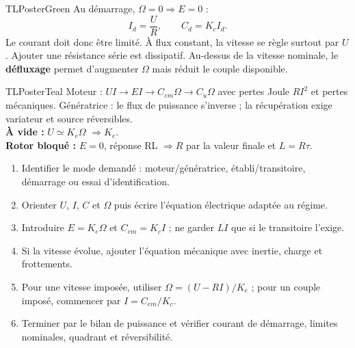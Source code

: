 \documentclass[10pt,a3paper]{article}
\begin{document}
\begin{minipage}[t]{0.49\linewidth}
\begin{TLPosterBloc}{TLPosterGreen}
Au démarrage, $\Omega=0\Rightarrow E=0$ :
\[
I_d=\frac{U}{R},\qquad C_d=K_cI_d.
\]
Le courant doit donc être limité. À flux constant, la vitesse se règle surtout par $U$. Ajouter une résistance série est dissipatif. Au-dessus de la vitesse nominale, le \textbf{défluxage} permet d'augmenter $\Omega$ mais réduit le couple disponible.
\end{TLPosterBloc}
\begin{TLPosterBloc}{TLPosterTeal}
Moteur : $UI\rightarrow EI\rightarrow C_{em}\Omega\rightarrow C_u\Omega$ avec pertes Joule $RI^2$ et pertes mécaniques. Génératrice : le flux de puissance s'inverse ; la récupération exige variateur et source réversibles.\\[1mm]
\textbf{À vide :} $U\simeq K_e\Omega$ $\Rightarrow K_e$.\\
\textbf{Rotor bloqué :} $E=0$, réponse RL $\Rightarrow R$ par la valeur finale et $L=R\tau$.
\end{TLPosterBloc}
\end{minipage}
\vfill
\begin{TLPosterMethode}
\begin{enumerate}
  \item Identifier le mode demandé : moteur/génératrice, établi/transitoire, démarrage ou essai d'identification.
  \item Orienter $U$, $I$, $C$ et $\Omega$ puis écrire l'équation électrique adaptée au régime.
  \item Introduire $E=K_e\Omega$ et $C_{em}=K_cI$ ; ne garder $L\dot I$ que si le transitoire l'exige.
  \item Si la vitesse évolue, ajouter l'équation mécanique avec inertie, charge et frottements.
  \item Pour une vitesse imposée, utiliser $\Omega=(U-RI)/K_e$ ; pour un couple imposé, commencer par $I=C_{em}/K_c$.
  \item Terminer par le bilan de puissance et vérifier courant de démarrage, limites nominales, quadrant et réversibilité.
\end{enumerate}
\end{TLPosterMethode}
\vfill
{}
\end{document}
